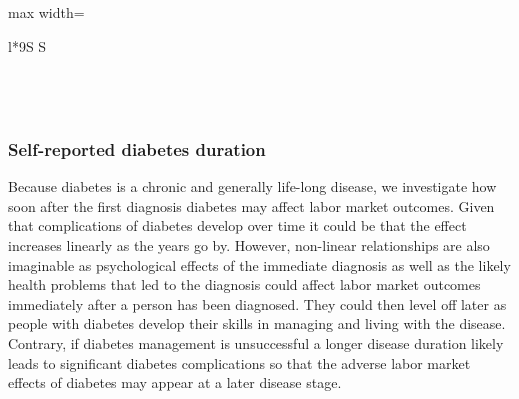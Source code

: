 \documentclass[12pt,english,british]{article}
\newcommand{\sym}[1]{\rlap{#1}}%
\begin{document}
\begin{table}[h]
\begin{center}
\begin{adjustbox}{max width=\textwidth}
{\begin{tabular}{l*{9}{S
S}}
\bottomrule
{}\\
\\
\\
\multicolumn{10}{l}{\footnotesize \sym{*} \(p<0.10\), \sym{**} \(p<0.05\), \sym{***} \(p<0.01\)}\\
\end{tabular}
}
\end{adjustbox}
\end{center}
\end{table}  

\FloatBarrier

\subsubsection*{Self-reported diabetes duration}

Because diabetes is a chronic and generally life-long disease, we investigate how soon after the first diagnosis diabetes may affect labor market outcomes. Given that complications of diabetes develop over time it could be that the effect increases
linearly as the years go by. However, non-linear relationships
are also imaginable as psychological effects of the immediate diagnosis
as well as the likely health problems that led to the diagnosis could
affect labor market outcomes immediately after a person has been
diagnosed. They could then level off later as people with diabetes
develop their skills in managing and living with the disease. Contrary, if diabetes management is unsuccessful a longer disease duration likely leads to significant diabetes complications so that the adverse labor market effects of diabetes may appear at a later disease stage.
\end{document}
